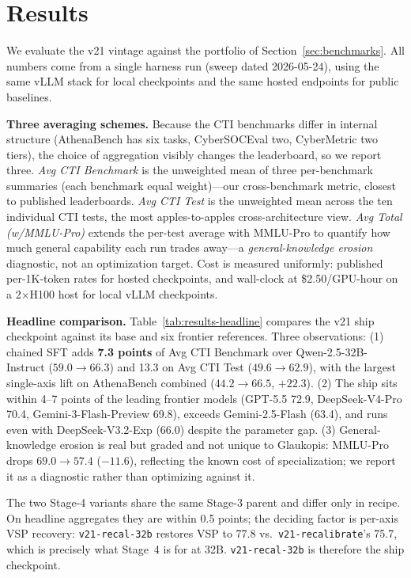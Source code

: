 \documentclass[conference]{IEEEtran}
\providecommand{\hfid}[1]{{\small\nolinkurl{#1}}}
\begin{document}
\section{Results}
\label{sec:results}

We evaluate the v21 vintage against the portfolio of Section~\ref{sec:benchmarks}. All numbers come from a single harness run (sweep dated 2026-05-24), using the same vLLM stack for local checkpoints and the same hosted endpoints for public baselines.

\textbf{Three averaging schemes.} Because the CTI benchmarks differ in internal structure (AthenaBench has six tasks, CyberSOCEval two, CyberMetric two tiers), the choice of aggregation visibly changes the leaderboard, so we report three. \emph{Avg CTI Benchmark} is the unweighted mean of three per-benchmark summaries (each benchmark equal weight)---our cross-benchmark metric, closest to published leaderboards. \emph{Avg CTI Test} is the unweighted mean across the ten individual CTI tests, the most apples-to-apples cross-architecture view. \emph{Avg Total (w/MMLU-Pro)} extends the per-test average with MMLU-Pro to quantify how much general capability each run trades away---a \textit{general-knowledge erosion} diagnostic, not an optimization target. Cost is measured uniformly: published per-1K-token rates for hosted checkpoints, and wall-clock at \$2.50/GPU-hour on a 2$\times$H100 host for local vLLM checkpoints.

\textbf{Headline comparison.} Table~\ref{tab:results-headline} compares the v21 ship checkpoint against its base and six frontier references. Three observations: (1) chained SFT adds \textbf{7.3 points} of Avg CTI Benchmark over Qwen-2.5-32B-Instruct ($59.0\to66.3$) and 13.3 on Avg CTI Test ($49.6\to62.9$), with the largest single-axis lift on AthenaBench combined ($44.2\to66.5$, $+22.3$). (2) The ship sits within 4--7 points of the leading frontier models (GPT-5.5 72.9, DeepSeek-V4-Pro 70.4, Gemini-3-Flash-Preview 69.8), exceeds Gemini-2.5-Flash (63.4), and runs even with DeepSeek-V3.2-Exp (66.0) despite the parameter gap. (3) General-knowledge erosion is real but graded and not unique to Glaukopis: MMLU-Pro drops $69.0\to57.4$ ($-11.6$), reflecting the known cost of specialization; we report it as a diagnostic rather than optimizing against it.

The two Stage-4 variants share the same Stage-3 parent and differ only in recipe. On headline aggregates they are within 0.5 points; the deciding factor is per-axis VSP recovery: \hfid{v21-recal-32b} restores VSP to 77.8 vs.\ \hfid{v21-recalibrate}'s 75.7, which is precisely what Stage~4 is for at 32B. \hfid{v21-recal-32b} is therefore the ship checkpoint.
\end{document}
